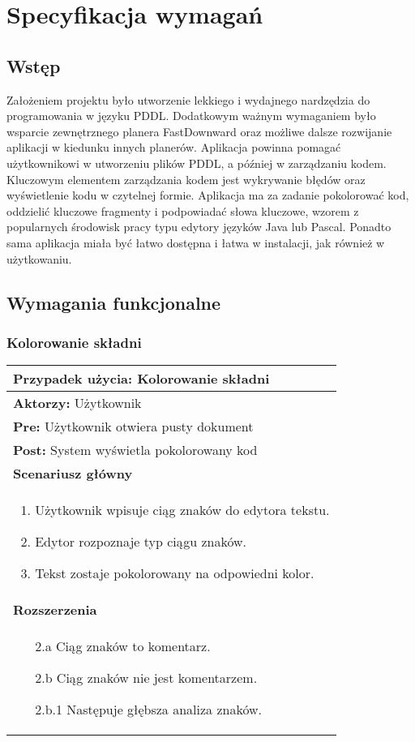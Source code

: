 \chapter{Specyfikacja wymagań}
\label{sec:specyfikacja}
\section{Wstęp}
Założeniem projektu było utworzenie lekkiego i wydajnego nardzędzia do programowania w języku PDDL. Dodatkowym ważnym wymaganiem było wsparcie zewnętrznego planera FastDownward oraz możliwe dalsze rozwijanie aplikacji w kiedunku innych planerów. Aplikacja powinna pomagać użytkownikowi w utworzeniu plików PDDL, a później w zarządzaniu kodem. Kluczowym elementem zarządzania kodem jest wykrywanie błędów oraz wyświetlenie kodu w czytelnej formie. Aplikacja ma za zadanie pokolorować kod, oddzielić kluczowe fragmenty i podpowiadać słowa kluczowe, wzorem z popularnych środowisk pracy typu edytory języków Java lub Pascal. Ponadto sama aplikacja miała być łatwo dostępna i łatwa w instalacji, jak również w użytkowaniu.
\section{Wymagania funkcjonalne}
\subsection{Kolorowanie składni}
\begin{tabular}{|p{8cm}|}
\hline 
\textbf{Przypadek użycia:} Kolorowanie składni\\
\hline
\textbf{Aktorzy:} Użytkownik\\
\hline
\textbf{Pre:} Użytkownik otwiera pusty dokument\\
\hline
\textbf{Post:} System wyświetla pokolorowany kod\\
\hline
\textbf{Scenariusz główny}\\
\hline
\begin{enumerate}
\item Użytkownik wpisuje ciąg znaków do edytora tekstu.
\item Edytor rozpoznaje typ ciągu znaków.
\item Tekst zostaje pokolorowany na odpowiedni kolor.
\end{enumerate}\\
\hline
\textbf{Rozszerzenia}\\
\hline
\begin{enumerate}
\item[2.a] Ciąg znaków to komentarz.
\item[2.b] Ciąg znaków nie jest komentarzem.
\item[2.b.1] Następuje głębsza analiza znaków.
\end{enumerate}\\
\hline
\end{tabular} 

